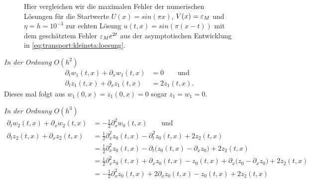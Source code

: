 \begin{figure}
\centering
{}
\caption{Hier vergleichen wir die maximalen Fehler der numerischen Lösungen für die Startwerte $U(x) = sin(\pi x)$, $V(x) = \varepsilon_M$ und $\eta = h = 10^{-3}$ zur echten Lösung $u(t,x) = sin(\pi(x - t))$ mit dem geschätztem Fehler $\varepsilon_M e^{2t}$ aus der asymptotischen Entwicklung in \eqref{eq:transport:kleineta:loesung}.}
\label{fig:transport:kleineta:max_error}
\end{figure}

\vspace{0.4cm}
\noindent \emph{In der Ordnung $O(h^2)$}
\begin{align*}
\partial_t w_1(t, x) + \partial_x w_1(t, x) &= 0 \qquad \text{und}\\
\partial_t z_1(t, x) + \partial_x z_1(t, x) &= 2 z_1(t, x).
\end{align*}
Dieses mal folgt aus $w_1(0,x) = z_1(0,x) = 0$ sogar $z_1 = w_1 = 0$.

\vspace{0.4cm}
\noindent \emph{In der Ordnung $O(h^3)$}
\begin{align*}
\partial_t w_2(t, x) + \partial_x w_2(t, x) &= - \frac{1}{2} \partial^2_x w_0(t, x) \qquad \text{und}\\
\partial_t z_2(t, x) + \partial_x z_2(t, x) &= \frac{1}{2} \partial^2_x z_0(t, x) - \partial^2_t z_0(t, x) + 2 z_2(t, x)\\
&= \frac{1}{2} \partial^2_x z_0(t, x) - \partial_t \bigl( z_0(t, x) - \partial_x z_0 \bigr) + 2 z_2(t, x)\\
&= \frac{1}{2} \partial^2_x z_0(t, x) + \partial_x z_0(t, x) - z_0(t, x) + \partial_x \bigl( z_0 - \partial_x z_0 \bigr) + 2 z_2(t, x)\\
&= - \frac{1}{2} \partial^2_x z_0(t, x) + 2 \partial_x z_0(t, x) - z_0(t, x) + 2 z_2(t, x)\\
\end{align*}

